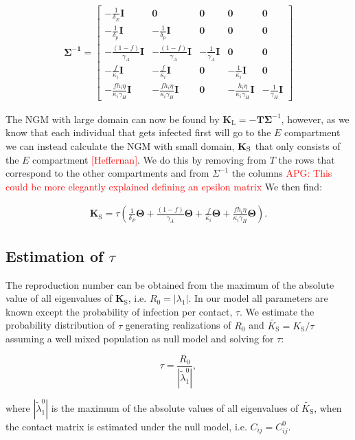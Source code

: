 \documentclass{article}
\newcommand{\bs}[1]{\boldsymbol{#1}}
\newcommand{\add}[1]{\textcolor{red}{#1}}
\begin{document}
\begin{gather}
\bs{\Sigma^{-1}} = 
  \begin{bmatrix}  
   - \frac{1}{\delta_E} \bs{I} & \bs{0} & \bs{0} & \bs{0} & \bs{0} \\
   -\frac{1}{\delta_p} \bs{I} & -\frac{1}{\delta_p} \bs{I} & \bs{0} & \bs{0} & \bs{0} \\
   -\frac{(1-f)}{\gamma_A} \bs{I} & -\frac{(1-f)}{\gamma_A} \bs{I} & -\frac{1}{\gamma_A} \bs{I} & \bs{0} & \bs{0} \\
   -\frac{f}{\kappa_i} \bs{I} & -\frac{f}{\kappa_i} \bs{I} & \bs{0} & -\frac{1}{\kappa_i} \bs{I} & \bs{0} \\
   -\frac{fh_i \eta}{\kappa_i\gamma_H} \bs{I} & -\frac{fh_i \eta}{\kappa_i\gamma_H} \bs{I} & \bs{0} & -\frac{h_i \eta}{\kappa_i\gamma_H} \bs{I} & -\frac{1}{\gamma_H} \bs{I} 
   \end{bmatrix}
\end{gather}

The NGM with large domain can now be found by $\bs{K_\mathrm{L}} = - \bs{T} \bs{\Sigma}^{-1}$, however, as we know that each individual that gets infected first will go to the $E$ compartment we can instead calculate the NGM with small domain, $\bf{K_\mathrm{S}}$ that only consists of the $E$ compartment \add{[Heffernan]}.
We do this by removing from $T$ the rows that correspond to the other compartments and from $\Sigma^{-1}$ the columns \add{APG: This could be more elegantly explained defining an epsilon matrix}
We then find: 

\begin{gather*}
\bs{K_\mathrm{S}} = \tau \left(\frac{1}{\delta_P} \bs{\Theta} + \frac{(1-f)}{\gamma_A} \bs{\Theta} + \frac{f}{\kappa_i}\bs{\Theta} + \frac{fh_i \eta}{\kappa_i\gamma_H} \bs{\Theta}\right).
\end{gather*}

\subsection*{Estimation of $\tau$}

The reproduction number can be obtained from the maximum of the absolute value of all eigenvalues of $\bs{K_\mathrm{S}}$,  i.e. $R_0 = |\lambda_1|$. In our model all parameters are known except the probability of infection per contact, $\tau$. We estimate the probability distribution of $\tau$ generating realizations of $R_0$ and $\tilde{K_\mathrm{S}}=K_\mathrm{S}/\tau$ assuming a well mixed population as null model and solving for $\tau$:

\begin{equation}
\tau = \frac{R_0}{|\tilde{\lambda}^0_1|},
\end{equation}

where $|\tilde{\lambda}^0_1|$ is the maximum of the absolute values of all eigenvalues of  $\tilde{K_\mathrm{S}}$, when the contact matrix is estimated under the null model, i.e. $C_{ij}=C^0_{ij}$. 
\end{document}
